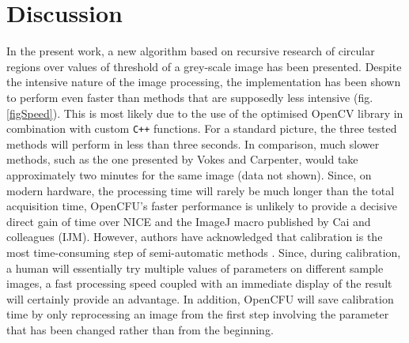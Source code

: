 \documentclass[10pt]{article}
\newcommand{\IJM}{IJM}
\begin{document}
\section*{Discussion}


In the present work, a new algorithm based on recursive research of circular
regions over values of threshold of a grey-scale image has been presented.
Despite the intensive nature of the image processing, the implementation has
been shown to perform even faster than methods that are supposedly less intensive
\cite{clarke_lowcost_2010,cai_optimized_2011} (fig.\ref{figSpeed}). This is most
likely due to the use of the optimised OpenCV library\cite{opencv_library} in
combination with custom \texttt{C++} functions.
For a standard picture, the three tested methods will perform in less than three
seconds. In comparison, much slower methods, such as the one presented by Vokes
and Carpenter\cite{vokes_using_2008}, would take approximately two minutes for
the same image (data not shown).
Since, on modern hardware, the processing time will rarely be much longer than
the total acquisition time, OpenCFU's faster performance is unlikely to provide
a decisive direct gain of time over NICE\cite{clarke_lowcost_2010} and
the ImageJ macro published by Cai
and colleagues (\IJM{})\cite{cai_optimized_2011}.
However, authors have acknowledged that calibration is the most time-consuming
step of semi-automatic methods \cite{vokes_using_2008,cai_optimized_2011}.
Since, during calibration, a human will essentially try multiple values of
parameters on different sample images, a fast processing speed coupled with an
immediate display of the result will certainly provide an advantage. In
addition, OpenCFU will save calibration time by only reprocessing an image from
the first step involving the parameter that has been changed rather than from
the beginning.
\end{document}
